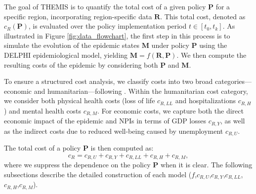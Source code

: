 \documentclass[msom,blindrev]{informs3} %
\begin{document}
\begin{table}[h!]
\centering
{}
\caption{Example Policy}
\label{tab:example_policy}
\end{table}
The goal of THEMIS is to quantify the total cost of a given policy $\bm{P}$ for a specific region, incorporating region-specific data $\bm{R}$. This total cost, denoted as $c_R(\bm{P})$, is evaluated over the policy implementation period $t \in [t_0,t_k]$. As illustrated in Figure \ref{fig:data_flowchart}, the first step in this process is to simulate the evolution of the epidemic states $\bm{M}$ under policy $\bm{P}$ using the DELPHI epidemiological model, yielding $\bm{M} = f(\bm{R},\bm{P})$. We then compute the resulting costs of the epidemic by considering both $\bm{P}$ and $\bm{M}$.

To ensure a structured cost analysis, we classify costs into two broad categories—economic and humanitarian—following . Within the humanitarian cost category, we consider both physical health costs (loss of life $c_{R,LL}$ and hospitalizations $c_{R,H}$) and mental health costs $c_{R,M}$. For economic costs, we capture both the direct economic impact of the epidemic and NPIs in terms of GDP losses $c_{R,Y}$, as well as the indirect costs due to reduced well-being caused by unemployment $c_{R,U}$.

The total cost of a policy $\bm{P}$ is then computed as:
\[c_R=c_{R,U} + c_{R,Y} + c_{R,LL} + c_{R,H} + c_{R,M},\]
where we suppress the dependence on the policy $\bm{P}$ when it is clear. The following subsections describe the detailed construction of each model ($f$,$c_{R,U}$,$c_{R,Y}$,$c_{R,LL}$,$c_{R,H}$,$c_{R,M}$).
\end{document}
